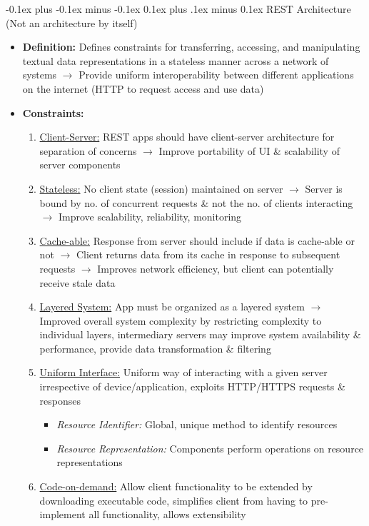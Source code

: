 \documentclass[landscape]{article}
\makeatletter
\renewcommand{\subsection}{\@startsection{subsection}{2}{0mm}%
  {-0.1ex plus -0.1ex minus -0.1ex}%
  {0.1ex plus .1ex minus 0.1ex}%
{\normalfont\scriptsize\bfseries}}
\makeatother
\begin{document}
\begin{multicols*}{5}
    \subsection{REST Architecture} (Not an architecture by itself)
    \begin{itemize}
      \item \textbf{Definition:} Defines constraints for transferring, accessing, and manipulating textual data representations in a stateless manner across a network of systems $\rightarrow$ Provide uniform interoperability between different applications on the internet (HTTP to request access and use data)
      \item \textbf{Constraints:}
      \begin{enumerate}
        \item \underline{Client-Server:} REST apps should have client-server architecture for separation of concerns $\rightarrow$ Improve portability of UI \& scalability of server components
        \item \underline{Stateless:} No client state (session) maintained on server $\rightarrow$ Server is bound by no. of concurrent requests \& not the no. of clients interacting $\rightarrow$ Improve scalability, reliability, monitoring
        \item \underline{Cache-able:} Response from server should include if data is cache-able or not $\rightarrow$ Client returns data from its cache in response to subsequent requests $\rightarrow$ Improves network efficiency, but client can potentially receive stale data
        \item \underline{Layered System:} App must be organized as a layered system $\rightarrow$ Improved overall system complexity by restricting complexity to individual layers, intermediary servers may improve system availability \& performance, provide data transformation \& filtering 
        \item \underline{Uniform Interface:} Uniform way of interacting with a given server irrespective of device/application, exploits HTTP/HTTPS requests \& responses
        \begin{itemize}
          \item \textit{Resource Identifier:} Global, unique method to identify resources
          \item \textit{Resource Representation:} Components perform operations on resource representations
        \end{itemize}
        \item \underline{Code-on-demand:} Allow client functionality to be extended by downloading executable code, simplifies client from having to pre-implement all functionality, allows extensibility

\end{enumerate}
\end{itemize}
\end{multicols*}
\end{document}

